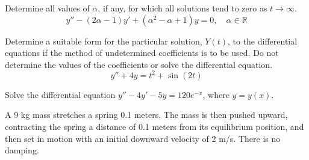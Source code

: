 \documentclass[12pt]{exam}
\begin{document}

\newpage

\InitialsRight

\begin{questions}
    

    \question[5] Determine all values of $\alpha$, if any, for which all solutions tend to zero as $t\to\infty$. $$y'' - (2\alpha - 1) y' + (\alpha^2-\alpha+1) y = 0, \quad \alpha \in \mathbb R$$ \vspace{10cm}  %
    
    \question[4]  Determine a suitable form for the particular solution, $Y(t)$, to the differential equations if the method of undetermined coefficients is to be used. Do not determine the values of the coefficients or solve the differential equation.
        $$y'' + 4y = t^2 + \sin(2t)$$
    
    \newpage    \InitialsLeft
    
        \question[10] Solve the differential equation $y''-4y'-5y = 120e^{-x}$, where $y=y(x)$. 
                


    \newpage \InitialsLeft
    
    \question[11] A 9 kg mass stretches a spring 0.1 meters. The mass is then pushed upward, contracting the spring a distance of 0.1 meters from its equilibrium position, and then set in motion with an initial downward velocity of 2 m/s. There is no damping. 
    


\end{questions}
\end{document}
